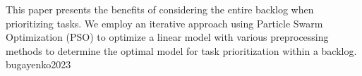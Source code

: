 \documentclass{article}
\begin{document}
  {This paper presents the benefits of considering the entire backlog when prioritizing tasks. We employ an iterative approach using Particle Swarm Optimization (PSO) to optimize a linear model with various preprocessing methods to determine the optimal model
for task prioritization within a backlog.}
  {bugayenko2023}
\end{document}
